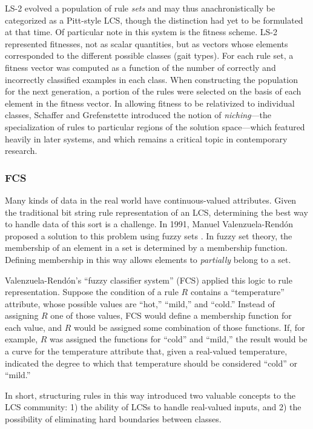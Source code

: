 \documentclass[12pt,twoside]{article}
\begin{document}
LS-2 evolved a population of rule \emph{sets} and may thus anachronistically be categorized as a Pitt-style LCS, though the distinction had yet to be formulated at that time. Of particular note in this system is the fitness scheme. LS-2 represented fitnesses, not as scalar quantities, but as vectors whose elements corresponded to the different possible classes (gait types). For each rule set, a fitness vector was computed as a function of the number of correctly and incorrectly classified examples in each class. When constructing the population for the next generation, a portion of the rules were selected on the basis of each element in the fitness vector. In allowing fitness to be relativized to individual classes, Schaffer and Grefenstette introduced the notion of \emph{niching}---the specialization of rules to particular regions of the solution space---which  featured heavily in later systems, and which remains a critical topic in contemporary research.

\subsubsection{FCS}

Many kinds of data in the real world have continuous-valued attributes. Given the traditional bit string rule representation of an LCS, determining the best way to handle data of this sort is a challenge. In 1991, Manuel Valenzuela-Rend\'on proposed a solution to this problem using fuzzy sets \cite{manuel_valenzuela-rendon_fuzzy_1991}. In fuzzy set theory, the membership of an element in a set is determined by a membership function. Defining membership in this way allows elements to \emph{partially} belong to a set.

Valenzuela-Rend\'on's ``fuzzy classifier system'' (FCS) applied this logic to rule representation. Suppose the condition of a rule $R$ contains a ``temperature'' attribute, whose possible values are ``hot,'' ``mild,'' and ``cold.'' Instead of assigning $R$ one of those values, FCS would define a membership function for each value, and $R$ would be assigned some combination of those functions. If, for example, $R$ was assigned the functions for ``cold'' and ``mild,'' the result would be a curve for the temperature attribute that, given a real-valued temperature, indicated the degree to which that temperature should be considered ``cold'' or ``mild.''

In short, structuring rules in this way introduced two valuable concepts to the LCS community: 1) the ability of LCSs to handle real-valued inputs, and 2) the possibility of eliminating hard boundaries between classes.
\end{document}

